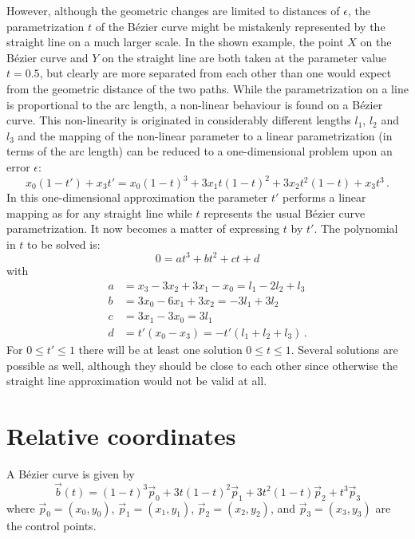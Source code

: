 \documentclass{article}
\begin{document}
However, although the geometric changes are limited to distances of
$\epsilon$, the parametrization $t$ of the B\'ezier curve might be
mistakenly represented by the straight line on a much larger scale.
In the shown example, the point $X$ on the B\'ezier curve and $Y$ on
the straight line are both taken at the parameter value $t=0.5$, but
clearly are more separated from each other than one would expect from
the geometric distance of the two paths. While the parametrization on
a line is proportional to the arc length, a non-linear behaviour is
found on a B\'ezier curve. This non-linearity is originated in
considerably different lengths $l_1$, $l_2$ and $l_3$ and the mapping
of the non-linear parameter to a linear parametrization (in terms of
the arc length) can be reduced to a one-dimensional problem upon an
error $\epsilon$:
%
\begin{equation}
  x_0(1-t')+x_3t' = x_0(1-t)^3 + 3x_1t(1-t)^2 + 3x_2t^2(1-t) + x_3 t^3\,.
\end{equation}
%
In this one-dimensional approximation the parameter $t'$ performs a
linear mapping as for any straight line while $t$ represents the usual
B\'ezier curve parametrization. It now becomes a matter of expressing
$t$ by $t'$. The polynomial in $t$ to be solved is:
%
\begin{equation}
  0 = at^3+bt^2+ct+d
\end{equation}
%
with
%
\begin{align}
  a & = x_3-3x_2+3x_1-x_0 = l_1-2l_2+l_3 \\
  b & = 3x_0-6x_1+3x_2 = -3l_1+3l_2 \\
  c & = 3x_1-3x_0 = 3l_1 \\
  d & = t'(x_0-x_3) = -t'(l_1+l_2+l_3)\,.
\end{align}
%
For $0\le t'\le1$ there will be at least one solution $0\le t\le1$.
Several solutions are possible as well, although they should be close
to each other since otherwise the straight line approximation would
not be valid at all.

\section{Relative coordinates}

A B\'ezier curve is given by
\begin{equation}
  \vec b(t) = (1-t)^3\vec p_0 + 3t(1-t)^2\vec p_1 + 3t^2(1-t)\vec p_2 + t^3\vec p_3
\end{equation}
where $\vec p_0 = (x_0, y_0)$, $\vec p_1 = (x_1, y_1)$, $\vec p_2 =
(x_2, y_2)$, and $\vec p_3 = (x_3, y_3)$ are the control points.
\end{document}
